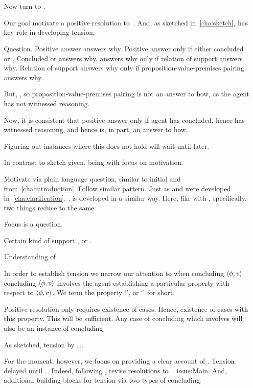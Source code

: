 \chapter{}
\label{cha:zS}

\begin{note}
  Now turn to \zSN{}.

  Our goal motivate a positive resolution to~\issueConstraint{}.
  And, as sketched in~\autoref{cha:sketch}, \zSN{} has key role in developing tension.

  Question.
  Positive answer answers why.
  Positive answer only if either concluded or \fc{}.
  Concluded or \fc{} answers why.
  \fc{} answers why only if relation of support answers why.
  Relation of support answers why only if proposition-value-premises pairing answers why.

  But, \fc{}, so proposition-value-premises pairing is not an answer to how, as the agent has not witnessed reasoning.

  Now, it is consistent that positive answer only if agent has concluded, hence has witnessed reasoning, and hence is, in part, an answer to how.

  Figuring out instances where this does not hold will wait until later.


  In contrast to sketch given, being with focus on motivation.

  Motivate \zSN{} via plain language question, similar to initial \qWhy{} and \qHow{} from~\autoref{cha:introduction}.
  Follow similar pattern.
  Just as \qWhy{} and \qHow{} were developed in~\autoref{cha:clarification}, \zSN{}, is developed in a similar way.
  Here, like with \qWhy{}, specifically, two things reduce to the same.
\end{note}

\begin{note}[Map]
  Focus is a question.

  Certain kind of support \zSN{}, or \zS{}.

  Understanding of \zS{}.
\end{note}

\begin{note}
  In order to establish tension we narrow our attention to when concluding \(\langle \phi, v \rangle\) concluding \(\langle \phi, v \rangle\) involves the agent establishing a particular property with respect to \(\langle \phi, v \rangle\).
  We term the property `', or `\zS{}' for short.

  Positive resolution only requires existence of cases.
  Hence, existence of cases with this property.
  This will be sufficient.
  Any case of concluding which involves \csVImp{} will also be an instance of concluding.

  As sketched, tension by {\color{red} \dots}.

  For the moment, however, we focus on providing a clear account of \csN{}.
  Tension delayed until \dots
  Indeed, following \csN{}, revise resolutions to ~{\color{red} issue:Main}.
  And, additional building blocks for tension via two types of concluding.
\end{note}

